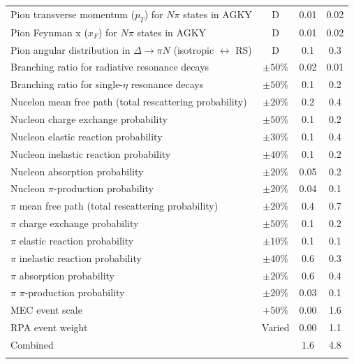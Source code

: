 \begin{longtable}{p{3.5in} c c c}
  Pion transverse momentum ($p_T$) for $N\pi$ states in AGKY & D & 0.01 & 0.02 \\
  Pion Feynman x ($x_F$) for $N\pi$ states in AGKY & D & 0.01 & 0.02 \\
  Pion angular distribution in $\Delta \rightarrow \pi N$ \newline (isotropic $\leftrightarrow$ RS) & D & 0.1 & 0.3 \\
  Branching ratio for radiative resonance decays & $\pm50\%$ & 0.02 & 0.01 \\
  Branching ratio for single-$\eta$ resonance decays & $\pm50\%$ & 0.1 & 0.2 \\
  Nucelon mean free path (total rescattering \newline probability) & $\pm20\%$ & 0.2 & 0.4 \\
  Nucleon charge exchange probability & $\pm50\%$ & 0.1 & 0.2 \\
  Nucleon elastic reaction probability & $\pm30\%$ & 0.1 & 0.4 \\
  Nucleon inelastic reaction probability & $\pm40\%$ & 0.1 & 0.2 \\
  Nucleon absorption probability & $\pm20\%$ & 0.05 & 0.2 \\
  Nucleon $\pi$-production probability & $\pm20\%$ & 0.04 & 0.1 \\
  $\pi$ mean free path (total rescattering probability) & $\pm20\%$ & 0.4 & 0.7 \\
  $\pi$ charge exchange probability & $\pm50\%$ & 0.1 & 0.2 \\
  $\pi$ elastic reaction probability & $\pm10\%$ & 0.1 & 0.1 \\
  $\pi$ inelastic reaction probability & $\pm40\%$ & 0.6 & 0.3 \\
  $\pi$ absorption probability & $\pm20\%$ & 0.6 & 0.4 \\
  $\pi$ $\pi$-production probability & $\pm20\%$ & 0.03 & 0.1 \\
  MEC event scale & $+50\%$ & 0.00 & 1.6 \\
  RPA event weight & Varied & 0.00 & 1.1 \\
  \hline
  Combined & & 1.6 & 4.8 \\
  \hline
  \label{tab:SystGENIE}
\end{longtable}
\doublespacing

